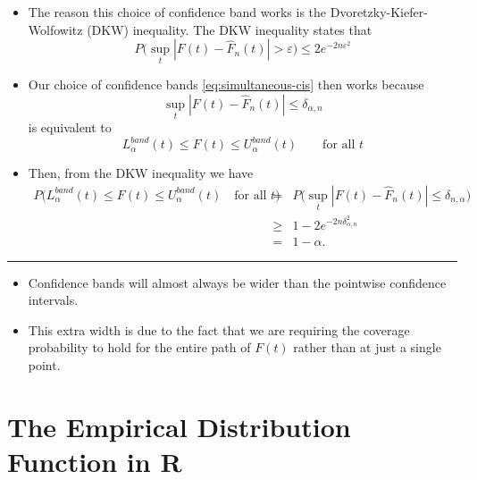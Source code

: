 \documentclass[]{book}
\begin{document}
\begin{itemize}
\item
  The reason this choice of confidence band works is the
  Dvoretzky-Kiefer-Wolfowitz (DKW) inequality.
  The DKW inequality states that
  \begin{equation}
  P\Bigg( \sup_{t} |F(t) - \hat{F}_{n}(t) | > \varepsilon \Bigg) \leq 2 e^{-2n \varepsilon^{2}}
  \nonumber
  \end{equation}
\item
  Our choice of confidence bands \eqref{eq:simultaneous-cis} then works because
  \begin{equation}
  \sup_{t} | F(t) - \hat{F}_{n}(t)| \leq \delta_{\alpha, n} \nonumber
  \end{equation}
  is equivalent to
  \begin{equation}
  L_{\alpha}^{band}(t) \leq F(t) \leq U_{\alpha}^{band}(t) \qquad \textrm{for all } t
  \nonumber
  \end{equation}
\item
  Then, from the DKW inequality we have
  \begin{eqnarray}
  P\Bigg( L_{\alpha}^{band}(t) \leq F(t) \leq U_{\alpha}^{band}(t) \quad \textrm{for all } t \Bigg)
  &=& P\Bigg( \sup_{t} | F(t) - \hat{F}_{n}(t)| \leq \delta_{n, \alpha} \Bigg) \nonumber \\
  &\geq& 1 - 2 e^{-2n \delta_{\alpha,n}^{2}} \nonumber \\
  &=& 1 - \alpha. \nonumber
  \end{eqnarray}
\end{itemize}

\begin{center}\rule{0.5\linewidth}{\linethickness}\end{center}

\begin{itemize}
\item
  Confidence bands will almost always be wider than
  the pointwise confidence intervals.
\item
  This extra width is due to the fact that we are requiring the coverage probability
  to hold for the entire path of \(F(t)\) rather than at
  just a single point.
\end{itemize}

\hypertarget{the-empirical-distribution-function-in-r}{%
\section{The Empirical Distribution Function in R}\label{the-empirical-distribution-function-in-r}}
\end{document}
